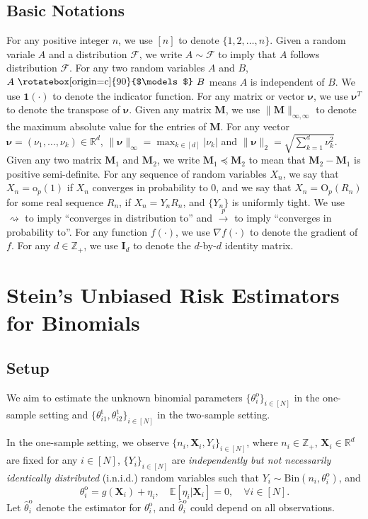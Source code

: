 \documentclass[12pt,letterpaper]{article}
\newcommand{\indep}{\ \raisebox{0.05em}{\rotatebox[origin=c]{90}{$\models$}} \ }
\begin{document}
\subsection{Basic Notations}
For any positive integer $n$, we use $[n]$ to denote $\{1,2,\ldots,n\}$. Given a random variale $A$ and a distribution $\mathcal{F}$, we write $A\sim\mathcal{F}$ to imply that $A$ follows distribution $\mathcal{F}$. For any two random variables $A$ and $B$, $A\indep B$ means $A$ is independent of $B$. We use $\mathbf{1}(\cdot)$ to denote the indicator function. For any matrix or vector $\boldsymbol{\nu}$, we use $\boldsymbol{\nu}^T$ to denote the transpose of $\boldsymbol{\nu}$. Given any matrix $\mathbf{M}$, we use $\|\mathbf{M}\|_{\infty,\infty}$ to denote the maximum absolute value for the entries of $\mathbf{M}$. For any vector $\boldsymbol{\nu}=(\nu_1,\ldots,\nu_k)\in\mathbb{R}^d$, $\|\boldsymbol{\nu}\|_{\infty}=\max_{k\in[d]}|\nu_k|$ and $\|\boldsymbol{\nu}\|_{2}=\sqrt{\sum_{k=1}^d\nu_k^2}$. Given any two matrix $\mathbf{M}_1$ and $\mathbf{M}_2$, we write $\mathbf{M}_1\preceq\mathbf{M}_2$ to mean that $\mathbf{M}_2-\mathbf{M}_1$ is positive semi-definite. For any sequence of random variables $X_n$, we say that $X_n=\mathrm{o}_p(1)$ if $X_n$ converges in probability to $0$, and we say that $X_n=\mathrm{O}_p(R_n)$ for some real sequence $R_n$, if $X_n=Y_nR_n$, and $\{Y_n\}$ is uniformly tight. We use $\rightsquigarrow$ to imply ``converges in distribution to'' and $\overset{p}{\rightarrow}$ to imply ``converges in probability to''. For any function $f(\cdot)$, we use $\nabla f(\cdot)$ to denote the gradient of $f$. For any $d\in\mathbb{Z}_{+}$, we use $\mathbf{I}_d$ to denote the $d$-by-$d$ identity matrix. 

\section{Stein's Unbiased Risk Estimators for Binomials}\label{sec:SURE}
\subsection{Setup} 
We aim to estimate the unknown binomial parameters $\{\theta_i^{\mathrm{o}}\}_{i\in[N]}$ in the one-sample setting and $\{\theta_{i1}^{\mathrm{t}},\theta_{i2}^{\mathrm{t}}\}_{i\in[N]}$ in the two-sample setting. 

In the one-sample setting, we observe $\{n_i,\mathbf{X}_i,Y_i\}_{i\in[N]}$, where $n_i\in\mathbb{Z}_{+}$, $\mathbf{X}_i\in\mathbb{R}^d$ are fixed for any $i\in[N]$, $\{Y_i\}_{i\in[N]}$ are \textit{independently but not necessarily identically distributed} (i.n.i.d.) random variables such that $Y_{i}\sim \mathrm{Bin}(n_i, \theta_i^{\textrm{o}})$, and
\begin{equation}\label{eq:one-sample:dependence:covariate}
    \theta_i^{\textrm{o}} = g(\mathbf{X}_i)+\eta_i,\quad \mathbb{E}[\eta_i|\mathbf{X}_i]=0,\quad \forall i\in[N].
\end{equation}
Let $\hat{\theta}_i^{\textrm{o}}$ denote the estimator for $\theta_i^{\textrm{o}}$, and $\hat{\theta}_i^{\textrm{o}}$ could depend on all observations. 
\end{document}
